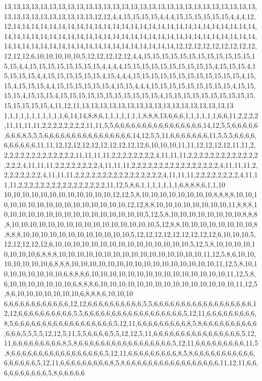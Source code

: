 13,13,13,13,13,13,13,13,13,13,13,13,13,13,13,13,13,13,13,13,13,13,13,13,13,13,13,13,13,13,13,13,13,13,13,13,13,13,12,12,4,4,15,15,15,15,4,4,4,15,15,15,15,15,15,4,4,4,12,12,14,14,14,14,14,14,14,14,14,14,14,14,14,14,14,14,14,14,14,14,14,14,14,14,14,14,14,14,14,14,14,14,14,14,14,14,14,14,14,14,14,14,14,14,14,14,14,14,14,14,14,14,14,14,14,14,14,14,14,14,14,14,14,14,14,14,14,14,14,14,14,14,14,14,12,12,12,12,12,12,12,12,12,12,12,12,6,10,10,10,10,10,5,12,12,12,12,12,4,4,15,15,15,15,15,15,15,15,15,15,15,15,15,15,4,4,15,15,15,15,15,15,15,15,4,4,4,4,15,15,15,15,15,15,15,15,15,15,4,15,15,15,4,15,15,15,15,4,4,15,15,15,15,15,15,4,15,4,4,4,15,15,15,15,15,15,15,15,15,15,15,15,4,15,15,4,15,15,15,4,4,15,15,15,15,15,15,4,15,15,4,4,4,15,15,15,15,15,15,15,15,15,4,15,15,15,15,4,15,15,15,4,15,15,15,15,15,15,15,15,15,15,15,4,15,15,15,15,15,15,15,15,15,15,15,15,15,15,15,4,11,12,11,13,13,13,13,13,13,13,13,13,13,13,13,13,13,13,13,13
1,1,1,1,1,1,1,1,1,1,1,6,14,14,8,8,6,1,1,1,1,1,1,1,8,8,8,13,6,6,6,1,1,1,1,1,1,6,6,11,2,2,2,2,11,11,11,11,2,2,2,2,2,2,2,2,11,11,5,5,6,6,6,6,6,6,6,6,6,6,6,6,6,6,6,6,14,12,5,5,6,6,6,6,6,6,6,6,8,5,5,5,6,6,6,6,6,6,6,6,6,6,6,6,6,6,6,6,14,12,5,5,11,6,6,6,6,6,6,6,11,5,5,5,6,6,6,6,6,6,6,6,6,6,11,11,12,12,12,12,12,12,12,12,12,12,6,10,10,10,11,11,12,12,12,12,11,11,2,2,2,2,2,2,2,2,2,2,2,2,2,2,11,11,11,11,2,2,2,2,2,2,2,2,4,11,11,11,2,2,2,2,2,2,2,2,2,2,2,2,2,2,2,2,4,11,11,11,2,2,2,2,2,2,2,2,4,11,11,11,2,2,2,2,2,2,2,2,2,2,2,2,2,2,2,2,4,11,11,11,2,2,2,2,2,2,2,2,4,11,11,11,2,2,2,2,2,2,2,2,2,2,2,2,2,2,2,2,4,11,11,11,2,2,2,2,2,2,2,2,4,11,11,11,2,2,2,2,2,2,2,2,2,2,2,2,2,2,2,2,11,12,5,8,6,1,1,1,1,1,1,1,6,8,8,8,6,1,1,10
10,10,10,10,10,10,10,10,10,10,10,10,12,12,5,8,10,10,10,10,10,10,10,10,8,8,8,8,10,10,10,10,10,10,10,10,10,10,10,10,10,10,10,10,12,12,8,8,10,10,10,10,10,10,10,10,11,8,8,8,10,10,10,10,10,10,10,10,10,10,10,10,10,10,10,10,5,12,5,8,10,10,10,10,10,10,10,10,8,8,8,8,10,10,10,10,10,10,10,10,10,10,10,10,10,10,10,10,5,12,8,8,10,10,10,10,10,10,10,10,8,8,8,8,10,10,10,10,10,10,10,10,10,10,10,10,5,12,12,12,12,12,12,12,12,12,6,10,10,10,5,12,12,12,12,12,6,10,10,10,10,10,10,10,10,10,10,10,10,10,10,10,5,12,5,8,10,10,10,10,10,10,10,10,6,8,8,8,10,10,10,10,10,10,10,10,10,10,10,10,10,10,10,10,11,12,5,8,6,10,10,10,10,10,10,10,6,8,8,8,10,10,10,10,10,10,10,10,10,10,10,10,10,10,10,10,11,12,5,8,10,10,10,10,10,10,10,10,6,8,8,8,6,10,10,10,10,10,10,10,10,10,10,10,10,10,10,10,11,12,5,8,6,10,10,10,10,10,10,10,6,8,8,8,6,10,10,10,10,10,10,10,10,10,10,10,10,10,10,10,11,12,5,8,6,10,10,10,10,10,10,10,6,8,8,8,6,10,10,10
6,6,6,6,6,6,6,6,6,6,6,6,12,12,6,6,6,6,6,6,6,6,6,6,5,5,6,6,6,6,6,6,6,6,6,6,6,6,6,6,6,6,6,6,12,12,6,6,6,6,6,6,6,6,6,6,5,5,6,6,6,6,6,6,6,6,6,6,6,6,6,6,6,6,6,6,5,12,11,6,6,6,6,6,6,6,6,6,8,5,6,6,6,6,6,6,6,6,6,6,6,6,6,6,6,6,6,6,5,12,11,6,6,6,6,6,6,6,6,6,8,5,8,6,6,6,6,6,6,6,6,6,6,6,6,6,5,5,5,5,12,12,5,11,5,5,6,6,6,6,5,5,12,12,5,11,6,6,6,6,6,6,6,6,6,6,6,6,6,6,6,6,5,12,11,6,6,6,6,6,6,6,6,6,8,5,8,6,6,6,6,6,6,6,6,6,6,6,6,6,6,6,6,6,5,12,11,6,6,6,6,6,6,6,6,6,11,5,8,6,6,6,6,6,6,6,6,6,6,6,6,6,6,6,6,6,5,12,11,6,6,6,6,6,6,6,6,6,8,5,8,6,6,6,6,6,6,6,6,6,6,6,6,6,6,6,6,6,5,12,11,6,6,6,6,6,6,6,6,6,8,5,8,6,6,6,6,6,6,6,6,6,6,6,6,6,6,6,6,6,11,12,11,6,6,6,6,6,6,6,6,6,6,5,8,6,6,6,6,6
